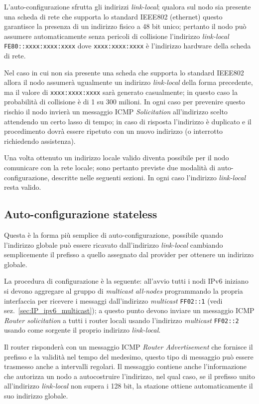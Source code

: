L'auto-configurazione sfrutta gli indirizzi \textit{link-local}; qualora sul nodo sia
presente una scheda di rete che supporta lo standard IEEE802 (ethernet) questo
garantisce la presenza di un indirizzo fisico a 48 bit unico; pertanto il nodo
può assumere automaticamente senza pericoli di collisione l'indirizzo
\textit{link-local} \texttt{FE80::xxxx:xxxx:xxxx} dove \texttt{xxxx:xxxx:xxxx} è
l'indirizzo hardware della scheda di rete. 

Nel caso in cui non sia presente una scheda che supporta lo standard IEEE802
allora il nodo assumerà ugualmente un indirizzo \textit{link-local} della forma
precedente, ma il valore di \texttt{xxxx:xxxx:xxxx} sarà generato
casualmente; in questo caso la probabilità di collisione è di 1 su 300
milioni. In ogni caso per prevenire questo rischio il nodo invierà un
messaggio ICMP \textit{Solicitation} all'indirizzo scelto attendendo un certo
lasso di tempo; in caso di risposta l'indirizzo è duplicato e il
procedimento dovrà essere ripetuto con un nuovo indirizzo (o interrotto
richiedendo assistenza).

Una volta ottenuto un indirizzo locale valido diventa possibile per il nodo
comunicare con la rete locale; sono pertanto previste due modalità di
auto-configurazione, descritte nelle seguenti sezioni. In ogni caso
l'indirizzo \textit{link-local} resta valido.

\subsection{Auto-configurazione stateless}
\label{sec:stateless}

Questa è la forma più semplice di auto-configurazione, possibile quando
l'indirizzo globale può essere ricavato dall'indirizzo \textit{link-local} cambiando
semplicemente il prefisso a quello assegnato dal provider per ottenere un
indirizzo globale.

La procedura di configurazione è la seguente: all'avvio tutti i nodi IPv6
iniziano si devono aggregare al gruppo di \textit{multicast}
\textit{all-nodes} programmando la propria interfaccia per ricevere i messaggi
dall'indirizzo \textit{multicast} \texttt{FF02::1} (vedi
sez.~\ref{sec:IP_ipv6_multicast}); a questo punto devono inviare un messaggio
ICMP \textit{Router solicitation} a tutti i router locali usando l'indirizzo
\textit{multicast} \texttt{FF02::2} usando come sorgente il proprio indirizzo
\textit{link-local}.

Il router risponderà con un messaggio ICMP \textit{Router Advertisement} che
fornisce il prefisso e la validità nel tempo del medesimo, questo tipo di
messaggio può essere trasmesso anche a intervalli regolari. Il messaggio
contiene anche l'informazione che autorizza un nodo a autocostruire
l'indirizzo, nel qual caso, se il prefisso unito all'indirizzo \textit{link-local} non
supera i 128 bit, la stazione ottiene automaticamente il suo indirizzo
globale.

